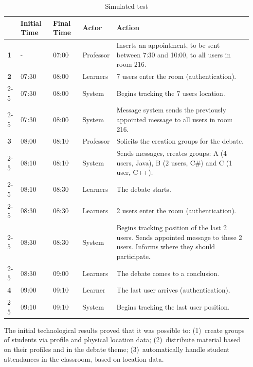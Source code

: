\documentclass[5p,authoryear]{elsarticle}
\begin{document}
\begin{table}
  \footnotesize
  \begin{tabular}{p{0.12cm}p{0.45cm}p{0.45cm}p{1cm}p{5cm}}
    \toprule
    & Initial Time & Final Time & Actor & Action \\
    \midrule
    \textbf{1} & - & 07:00 & Professor & Inserts an appointment, to be sent between 7:30 and 10:00, to all users in room 216. \\
    \midrule
    \textbf{2} & 07:30 & 08:00 & Learners & 7 users enter the room (authentication). \\
    \cmidrule(r){2-5}
    & 07:30 & 08:00 & System & Begins tracking the 7 users location. \\
    \cmidrule(r){2-5}
    & 07:30 & 08:00 & System & Message system sends the previously appointed message to all users in room 216. \\
    \midrule
    \textbf{3} & 08:00 & 08:10 & Professor & Solicits the creation groups for the debate. \\
    \cmidrule(r){2-5}
    & 08:10 & 08:10 & System & Sends messages, creates groups: A (4 users, Java), B (2 users, C\#) and C (1 user, C++). \\  
    \cmidrule(r){2-5}
    & 08:10 & 08:30 & Learners & The debate starts. \\
    \cmidrule(r){2-5}
    & 08:30 & 08:30 & Learners & 2 users enter the room (authentication).  \\
    \cmidrule(r){2-5}
    & 08:30 & 08:30 & System & Begins tracking position of the last 2 users. Sends appointed message to these 2 users. Informs where they should participate. \\  
    \cmidrule(r){2-5}
    & 08:30 & 09:00 & Learners & The debate comes to a conclusion. \\
    \midrule
    \textbf{4} & 09:00 & 09:10 & Learner & The last user arrives (authentication). \\  
    \cmidrule(r){2-5}
    & 09:10 & 09:10 & System & Begins tracking the last user position. \\
    \bottomrule
  \end{tabular}
  \caption{Simulated test}
  \label{tab:simulated}
\end{table}

The initial technological results proved that it was possible to: (1)~create
groups of students via profile and physical location data; (2)~distribute
material based on their profiles and in the debate theme; (3)~automatically
handle student attendances in the classroom, based on location data.
\end{document}

